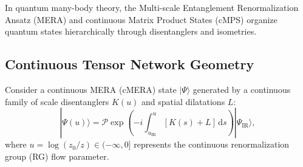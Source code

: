\documentclass[11pt,a4paper,reqno]{amsart}
\theoremstyle{definition}
\numberwithin{equation}{section}
\newcommand{\dif}{\,\mathrm{d}}
\begin{document}
In quantum many-body theory, the Multi-scale Entanglement Renormalization Ansatz (MERA) and continuous Matrix Product States (cMPS) organize quantum states hierarchically through disentanglers and isometries.

\begin{figure}[htbp]
\centering
\begin{minipage}{0.95\textwidth}
\centering
{}
\end{minipage}
\end{figure}

\subsection{Continuous Tensor Network Geometry}
Consider a continuous MERA (cMERA) state $|\Psi\rangle$ generated by a continuous family of scale disentanglers $K(u)$ and spatial dilatations $L$:
\begin{equation}
    \label{eq:cmera_state}
    |\Psi(u)\rangle = \mathcal{P} \exp\left( -i \int_{u_{\mathrm{IR}}}^u [K(s) + L] \dif s \right) |\Psi_{\mathrm{IR}}\rangle,
\end{equation}
where $u = \log(z_0 / z) \in (-\infty, 0]$ represents the continuous renormalization group (RG) flow parameter.
\end{document}
